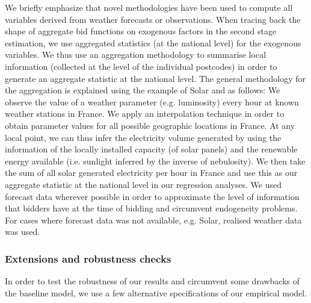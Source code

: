 We briefly emphasize that novel methodologies have been used to compute all variables derived from weather forecasts or observations. 
When tracing back the shape of aggregate bid functions on exogenous factors in the second stage estimation, we use aggregated statistics (at the national level) for the exogenous variables. We thus use an aggregation methodology to summarise local information (collected at the level of the individual postcodes) in order to generate an aggregate statistic at the national level. 
The general methodology for the aggregation is explained using the example of Solar and as follows: We observe the value of a weather parameter (e.g. luminosity) every hour at known weather stations in France. 
We apply an interpolation technique in order to obtain parameter values for all possible geographic locations in France. At any local point, we can thus infer the electricity volume generated by using the information of the locally installed capacity (of solar panels) and the renewable energy available (i.e. sunlight inferred by the inverse of nebulosity). We then take the sum of all solar generated electricity per hour in France and use this as our aggregate statistic at the national level in our regression analyses. 
We used forecast data wherever possible in order to approximate the level of information that bidders have at the time of bidding and circumvent endogeneity problems. 
For cases where forecast data was not available, e.g. Solar, realised weather data was used. 


\subsubsection{Extensions and robustness checks}
In order to test the robustness of our results and circumvent some drawbacks of the baseline model, we use a few alternative specifications of our empirical model. 

%




